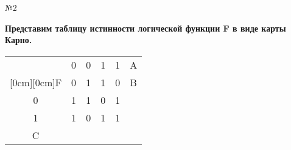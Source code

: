 \documentclass[]{article}
\begin{document}
	\vspace{20pt}
	\centering
	\normalsize
	\begin{center}\begin{large}{№2}\end{large}\end{center}
	\textbf{Представим таблицу истинности логической функции F в виде карты Карно.}
	
	\centering
	\normalsize
	
	
	\begin{tabular}{|c|c|c|c|c|c|}
	\hline
	&0&0&1&1&A \\
	\cline{2-6}
	\raisebox{1.5ex}[0cm][0cm]{F}
	&0&1&1&0&B \\
	\hline
	0&1&1&0&1 \\
	\cline{1-5}
	1&1&0&1&1\\
	\cline{1-5}
	C\\
	\cline{1-1}
	
\end{tabular}
	
\end{document}
